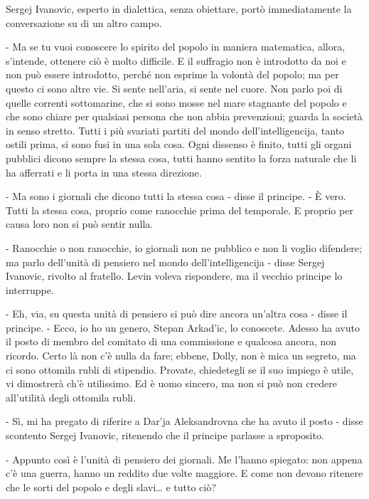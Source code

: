 \label{xvi-7} 

Sergej Ivanovic, esperto in dialettica, senza obiettare, portò immediatamente la conversazione su di un altro campo. 

- Ma se tu vuoi conoscere lo spirito del popolo in maniera matematica, allora, s'intende, ottenere ciò è molto difficile. E il suffragio non è introdotto da noi e non può essere introdotto, perché non esprime la volontà del popolo; ma per questo ci sono altre vie. Si sente nell'aria, si sente nel cuore. Non parlo poi di quelle correnti sottomarine, che si sono mosse nel mare stagnante del popolo e che sono chiare per qualsiasi persona che non abbia prevenzioni; guarda la società in senso stretto. Tutti i più svariati partiti del mondo dell'intelligencija, tanto ostili prima, si sono fusi in una sola cosa. Ogni dissenso è finito, tutti gli organi pubblici dicono sempre la stessa cosa, tutti hanno sentito la forza naturale che li ha afferrati e li porta in una stessa direzione. 

- Ma sono i giornali che dicono tutti la stessa cosa - disse il principe. - È vero. Tutti la stessa cosa, proprio come ranocchie prima del temporale. E proprio per causa loro non si può sentir nulla. 

- Ranocchie o non ranocchie, io giornali non ne pubblico e non li voglio difendere; ma parlo dell'unità di pensiero nel mondo dell'intelligencija - disse Sergej Ivanovic, rivolto al fratello. Levin voleva rispondere, ma il vecchio principe lo interruppe. 

- Eh, via, su questa unità di pensiero si può dire ancora un'altra cosa - disse il principe. - Ecco, io ho un genero, Stepan Arkad'ic, lo conoscete. Adesso ha avuto il posto di membro del comitato di una commissione e qualcosa ancora, non ricordo. Certo là non c'è nulla da fare; ebbene, Dolly, non è mica un segreto, ma ci sono ottomila rubli di stipendio. Provate, chiedetegli se il suo impiego è utile, vi dimostrerà ch'è utilissimo. Ed è uomo sincero, ma non si può non credere all'utilità degli ottomila rubli. 

- Sì, mi ha pregato di riferire a Dar'ja Aleksandrovna che ha avuto il posto - disse scontento Sergej Ivanovic, ritenendo che il principe parlasse a sproposito. 

- Appunto così è l'unità di pensiero dei giornali. Me l'hanno spiegato: non appena c'è una guerra, hanno un reddito due volte maggiore. E come non devono ritenere che le sorti del popolo e degli slavi\ldots{} e tutto ciò? 


